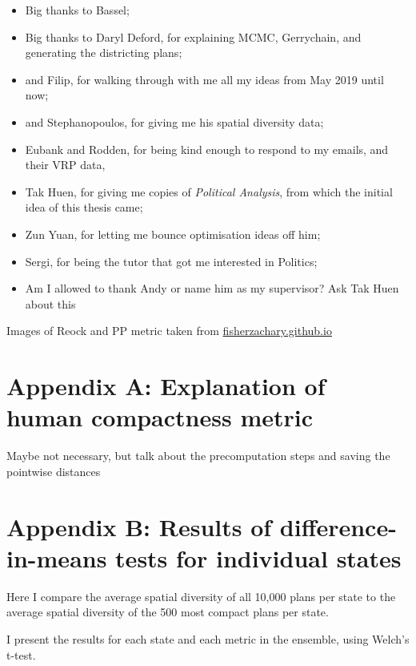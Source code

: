 \documentclass[]{article}
\providecommand{\tightlist}{%
  \setlength{\itemsep}{0pt}\setlength{\parskip}{0pt}}
\begin{document}
\begin{itemize}
\tightlist
\item
  Big thanks to Bassel;
\item
  Big thanks to Daryl Deford, for explaining MCMC, Gerrychain, and
  generating the districting plans;
\item
  and Filip, for walking through with me all my ideas from May 2019
  until now;
\item
  and Stephanopoulos, for giving me his spatial diversity data;
\item
  Eubank and Rodden, for being kind enough to respond to my emails, and
  their VRP data,
\item
  Tak Huen, for giving me copies of \emph{Political Analysis}, from
  which the initial idea of this thesis came;
\item
  Zun Yuan, for letting me bounce optimisation ideas off him;
\item
  Sergi, for being the tutor that got me interested in Politics;
\item
  Am I allowed to thank Andy or name him as my supervisor? Ask Tak Huen
  about this
\end{itemize}

Images of Reock and PP metric taken from
\href{https://fisherzachary.github.io/public/r-output.html}{fisherzachary.github.io}

\hypertarget{appendix-a-explanation-of-human-compactness-metric}{%
\section{Appendix A: Explanation of human compactness
metric}\label{appendix-a-explanation-of-human-compactness-metric}}

Maybe not necessary, but talk about the precomputation steps and saving
the pointwise distances

\hypertarget{appendix-b-results-of-difference-in-means-tests-for-individual-states}{%
\section{Appendix B: Results of difference-in-means tests for individual
states}\label{appendix-b-results-of-difference-in-means-tests-for-individual-states}}

Here I compare the average spatial diversity of all 10,000 plans per
state to the average spatial diversity of the 500 most compact plans per
state.

I present the results for each state and each metric in the ensemble,
using Welch's t-test.
\end{document}

